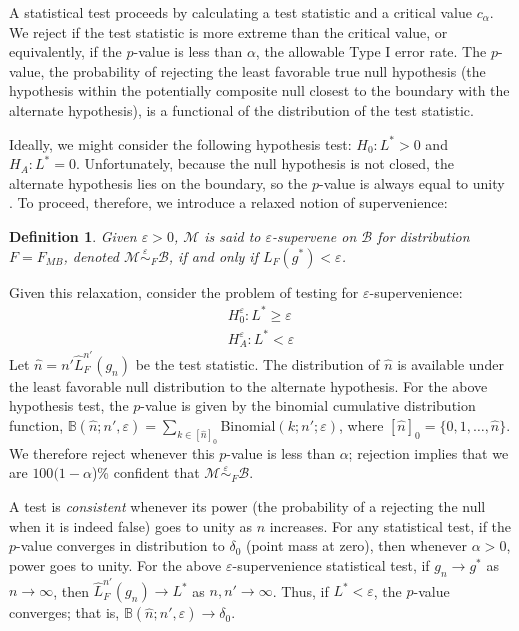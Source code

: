 \documentclass{article}
\newcommand{\conv}{\rightarrow}
\newcommand{\mB}{\mathcal{B}}
\newcommand{\mM}{\mathcal{M}}
\newcommand{\eps}{\varepsilon}
\providecommand{\mh}[1]{\widehat{#1}}
\newcommand{\hL}{\widehat{L}}
\newcommand{\MeB}{\mM \overset{\varepsilon}{{\sim}}_{F} \mB}
\newtheorem{defi}{Definition}
\begin{document}
A statistical test proceeds by calculating a test statistic and a critical value $c_\alpha$.  We reject if the test statistic is more extreme than the critical value, or equivalently, if the $p$-value is less than $\alpha$, the allowable Type I error rate.   The $p$-value, the probability of rejecting the least favorable true null hypothesis (the hypothesis within the potentially composite null closest to the boundary with the alternate hypothesis), is a functional of the distribution of the test statistic. 

Ideally, we might consider the following hypothesis test: $H_0: L^*>0$ and $H_A: L^*=0$.  Unfortunately, because the null hypothesis is not closed, the alternate hypothesis lies on the boundary, so the $p$-value is always equal to unity \cite{Bickel2000}.  To proceed, therefore, we introduce a relaxed notion of supervenience:
\begin{defi}
\label{def2}
Given $\varepsilon > 0$, $\mM$ is said to $\varepsilon$-\textit{supervene} on $\mB$ for distribution $F=F_{MB}$, denoted $\MeB$, if and only if $L_{F}(g^*) < \varepsilon$.
\end{defi}
\noindent Given this relaxation, consider the problem of testing for $\eps$-supervenience:
\begin{align*}
	H_0^{\eps}: L^* \geq \eps \\
	H_A^{\eps}: L^* < \eps
\end{align*}
Let $\mh{n}= n' \hL^{n'}_{F}(g_n)$ be the test statistic.  The distribution of $\mh{n}$ is available under the least favorable null distribution to the alternate hypothesis.  For the above hypothesis test,  the $p$-value is given by the binomial cumulative distribution function, $\mathbb{B}(\mh{n}; n', \eps)= \sum_{k \in [\mh{n}]_0}$Binomial$(k; n'; \eps)$, where $[\mh{n}]_0=\{0,1,\ldots, \mh{n}\}$.  We therefore reject whenever this $p$-value is less than $\alpha$; rejection implies that we are $100(1-\alpha$)\% confident that $\MeB$.   

A test is \emph{consistent} whenever its power  (the probability of a rejecting the null when it is indeed false)  goes to unity as $n$ increases. For any statistical test, if the $p$-value converges in distribution to $\delta_0$ (point mass at zero), then whenever $\alpha >0$, power goes to unity.  For the above $\eps$-supervenience statistical test, if $g_n \conv g^*$ as $n \conv \infty$, then $\hL^{n'}_F(g_n) \conv L^*$ as $n,n' \conv \infty$.  Thus, if $L^* < \eps$, the $p$-value converges; that is, $\mathbb{B}(\mh{n}; n', \eps) \conv \delta_0$.
\end{document}
